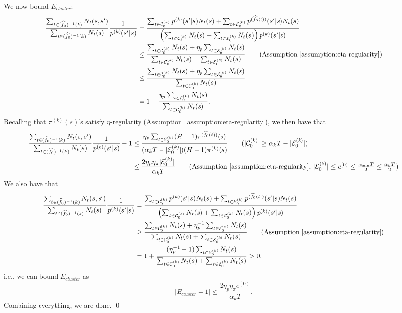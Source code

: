 \documentclass[twoside]{article}
\def\gC{{\mathcal{C}}}
\def\gE{{\mathcal{E}}}
\theoremstyle{plain}
\begin{document}
We now bound $E_{cluster}$:
\begin{align*}
    \frac{\sum_{t \in (\widehat{f}_0)^{-1}(k)} N_t(s, s')}{\sum_{t \in (\widehat{f}_0)^{-1}(k)} N_t(s)} \frac{1}{p^{(k)}(s' | s)} &= \frac{\sum_{t \in \gC_0^{(k)}} p^{(k)}(s' | s) N_t(s) + \sum_{t \in \gE_0^{(k)}} p^{(\widehat{f}_0(t))}(s' | s) N_t(s)}{\left( \sum_{t \in \gC_0^{(k)}} N_t(s) + \sum_{t \in \gE_0^{(k)}} N_t(s) \right) p^{(k)}(s' | s)} \\
   &\leq \frac{\sum_{t \in \gC_0^{(k)}} N_t(s) + \eta_p \sum_{t \in \gE_0^{(k)}} N_t(s)}{\sum_{t \in \gC_0^{(k)}} N_t(s) + \sum_{t \in \gE_0^{(k)}} N_t(s)} \tag{Assumption~\ref{assumption:eta-regularity}} \\
   &\leq \frac{\sum_{t \in \gC_0^{(k)}} N_t(s) + \eta_p \sum_{t \in \gE_0^{(k)}} N_t(s)}{\sum_{t \in \gC_0^{(k)}} N_t(s)} \\
   &= 1 + \frac{\eta_p \sum_{t \in \gE_0^{(k)}} N_t(s)}{\sum_{t \in \gC_0^{(k)}} N_t(s)}.
\end{align*}
Recalling that $\pi^{(k)}(s)$'s satisfy $\eta$-regularity (Assumption~\ref{assumption:eta-regularity}), we then have that
\begin{align*}
    \frac{\sum_{t \in (\widehat{f}_0)^{-1}(k)} N_t(s, s')}{\sum_{t \in (\widehat{f}_0)^{-1}(k)} N_t(s)} \frac{1}{p^{(k)}(s' | s)} - 1 &\leq \frac{\eta_p \sum_{t \in \gE_0^{(k)}} (H - 1) \pi^{(\widehat{f}_0(t))}(s)}{(\alpha_k T - |\gE_0^{(k)}|) (H - 1) \pi^{(k)}(s)} \tag{$|\gC_0^{(k)}| \geq \alpha_k T - |\gE_0^{(k)}|$} \\
    &\leq \frac{2 \eta_p \eta_\pi |\gE_0^{(k)}|}{\alpha_k T} \tag{Assumption~\ref{assumption:eta-regularity}, $|\gE_0^{(k)}| \leq e^{(0)} \leq \frac{\alpha_{\min} T}{2} \leq \frac{\alpha_k T}{2}$}
\end{align*}
We also have that
\begin{align*}
    \frac{\sum_{t \in (\widehat{f}_0)^{-1}(k)} N_t(s, s')}{\sum_{t \in (\widehat{f}_0)^{-1}(k)} N_t(s)} \frac{1}{p^{(k)}(s' | s)} &= \frac{\sum_{t \in \gC_0^{(k)}} p^{(k)}(s' | s) N_t(s) + \sum_{t \in \gE_0^{(k)}} p^{(\widehat{f}_0(t))}(s' | s) N_t(s)}{\left( \sum_{t \in \gC_0^{(k)}} N_t(s) + \sum_{t \in \gE_0^{(k)}} N_t(s) \right) p^{(k)}(s' | s)} \\
    &\geq \frac{\sum_{t \in \gC_0^{(k)}} N_t(s) + \eta_p^{-1} \sum_{t \in \gE_0^{(k)}} N_t(s)}{\sum_{t \in \gC_0^{(k)}} N_t(s) + \sum_{t \in \gE_0^{(k)}} N_t(s)} \tag{Assumption~\ref{assumption:eta-regularity}} \\
    &= 1 + \frac{(\eta_p^{-1} - 1) \sum_{t \in \gE_0^{(k)}} N_t(s)}{\sum_{t \in \gC_0^{(k)}} N_t(s) + \sum_{t \in \gE_0^{(k)}} N_t(s)} > 0,
\end{align*}
i.e., we can bound $E_{cluster}$ as
\begin{equation}
    |E_{cluster} - 1| \leq \frac{2 \eta_p \eta_\pi e^{(0)}}{\alpha_k T}.
\end{equation}
Combining everything, we are done.
\qed
\end{document}
